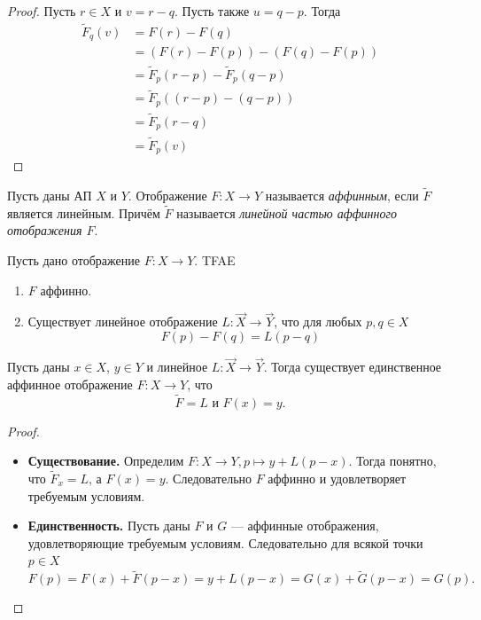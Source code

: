 \documentclass[12pt,a4paper]{article}
\begin{document}
    \begin{proof}
        Пусть $r \in X$ и $v = r - q$. Пусть также $u = q - p$. Тогда
        \begin{align*}
            \widetilde{F}_q(v)
            &= F(r) - F(q)\\
            &= (F(r) - F(p)) - (F(q) - F(p))\\
            &= \widetilde{F}_p(r - p) - \widetilde{F}_p(q - p)\\
            &= \widetilde{F}_p((r - p) - (q - p))\\
            &= \widetilde{F}_p(r - q)\\
            &= \widetilde{F}_p(v)
        \end{align*}
    \end{proof}

    \begin{definition}
        Пусть даны АП $X$ и $Y$. Отображение $F: X \to Y$ называется \emph{аффинным}, если $\widetilde{F}$ является линейным. Причём $\widetilde{F}$ называется \emph{линейной частью аффинного отображения $F$}.
    \end{definition}

    \begin{lemma}
        Пусть дано отображение $F: X \to Y$. TFAE
        \begin{enumerate}
            \item $F$ аффинно.
            \item Существует линейное отображение $L: \overrightarrow{X} \to \overrightarrow{Y}$, что для любых $p, q \in X$
                \[F(p) - F(q) = L(p - q)\]
        \end{enumerate}
    \end{lemma}

    \begin{theorem}
        Пусть даны $x \in X$, $y \in Y$ и линейное $L: \overrightarrow{X} \to \overrightarrow{Y}$. Тогда существует единственное аффинное отображение $F: X \to Y$, что
        \[\widetilde{F} = L \text{ и } F(x) = y.\] 
    \end{theorem}

    \begin{proof}
        \begin{itemize}
            \item \textbf{Существование.} Определим
                $F: X \to Y, p \mapsto y + L(p - x).$
                Тогда понятно, что $\widetilde{F}_x = L$, а $F(x) = y$. Следовательно $F$ аффинно и удовлетворяет требуемым условиям.
            \item \textbf{Единственность.} Пусть даны $F$ и $G$ --- аффинные отображения, удовлетворяющие требуемым условиям. Следовательно для всякой точки $p \in X$
                \[F(p) = F(x) + \widetilde{F}(p - x) = y + L(p - x) = G(x) + \widetilde{G}(p - x) = G(p).\]
        \end{itemize}
    \end{proof}
\end{document}
